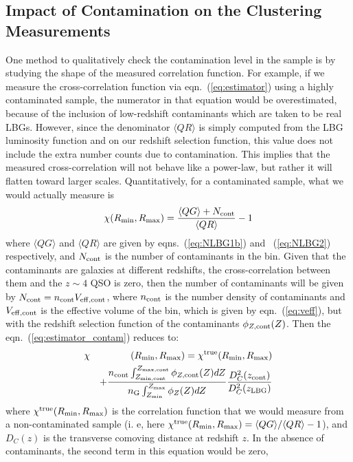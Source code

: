 \documentclass[iop, revtex4]{emulateapj}
\begin{document}
\subsection{Impact of Contamination on the Clustering Measurements}
\label{sec:robustness}

One method to qualitatively check the contamination level in the
sample is by studying the shape of the measured correlation
function. For example, if we measure the cross-correlation function via
eqn.~(\ref{eq:estimator}) using a highly contaminated sample, the
numerator in that equation would be overestimated, because of
the inclusion of low-redshift contaminants which are taken to be
real LBGs. However, since the denominator $\langle QR\rangle$ is simply
computed from the LBG luminosity function and on our redshift selection function, this
value does not include the extra number counts due to contamination. This implies
that the measured cross-correlation will not behave like a power-law, 
but rather it will flatten toward larger scales. Quantitatively, for
a contaminated sample, what we would actually measure is
\begin{equation}
\chi (R_{\rm min}, R_{\rm max})=  \frac{\langle QG\rangle + N_{\rm cont}}{\langle QR\rangle} -1 
\label{eq:estimator_contam}
\end{equation}
where $\langle QG\rangle $ and $\langle QR\rangle$ are given by
eqns.~(\ref{eq:NLBG1b}) and ~(\ref{eq:NLBG2}) respectively, and
$N_{\rm cont}$ is the number of contaminants in the bin. Given that
the contaminants are galaxies at different redshifts, the
cross-correlation between them and the $z\sim4$ QSO is zero, then the
number of contaminants will be given by $N_{\rm cont} = n_{\rm
  cont}V_{\rm eff, cont}$, where $n_{\rm cont}$ is the number density
of contaminants and $V_{\rm eff, cont}$ is the effective volume of the
bin,
which is given by eqn.~(\ref{eq:veff}), but with the redshift
selection function of the contaminants $\phi_{Z, \rm cont}(Z)$.
Then the
eqn.~(\ref{eq:estimator_contam}) reduces to:
\begin{eqnarray}
  \chi && (R_{\rm min},  R_{\rm max})=  \chi^{\rm true}(R_{\rm min},  R_{\rm max}) \nonumber \\
&&+ \frac{n_{\rm cont}\int_{Z_{\rm min, cont}}^{Z_{\rm max, cont}} \phi_{Z, \rm cont}(Z)dZ }{n_{\rm G} \int_{Z_{\rm min}}^{Z_{\rm max}} \phi_{Z}(Z)dZ} \frac{D_{C}^{2}(z_{\rm cont})}{D_{C}^{2}(z_{\rm LBG})} 
\label{eq:estimator_contam2}
\end{eqnarray}
where $\chi^{\rm true} (R_{\rm min},  R_{\rm max})$ is the correlation function that we would measure from a non-contaminated sample (i. e, here $\chi^{\rm true}(R_{\rm min},  R_{\rm max})=\langle QG\rangle/\langle QR\rangle -1$), and $D_{C}(z)$ is the transverse comoving distance at redshift $z$. In the absence of contaminants, the second term in this equation would be zero, 
\end{document}
